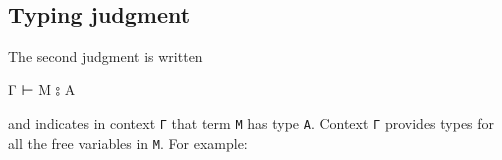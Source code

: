 \begin{fence}
\begin{code}%
\>[0]%
\>[1605I]\AgdaSymbol{:}\AgdaSpace{}%
\AgdaSpace{}%
\AgdaSymbol{\{}\AgdaSpace{}%
\AgdaSpace{}%
\AgdaSpace{}%
\AgdaSpace{}%
\AgdaSymbol{\}}\<%
\\
\>[.][@{}l@{}]\<[1605I]%
\>[3]\AgdaSpace{}%
\AgdaSymbol{\{}\AgdaSpace{}%
\AgdaSymbol{:}\AgdaSpace{}%
\AgdaSpace{}%
\AgdaSymbol{(}\AgdaSpace{}%
\AgdaSpace{}%
\AgdaSymbol{)\}}\<%
\\
%
\>[3]%
\>[1618I]\AgdaSpace{}%
\AgdaSpace{}%
\AgdaSpace{}%
\AgdaSpace{}%
\<%
\\
\>[.][@{}l@{}]\<[1618I]%
\>[5]\AgdaComment{------------------}\<%
\\
%
\>[3]\AgdaSpace{}%
\AgdaSpace{}%
\AgdaOperator{\AgdaInductiveConstructor{,}}\AgdaSpace{}%
\AgdaSpace{}%
\AgdaSpace{}%
\AgdaSpace{}%
\AgdaSpace{}%
\AgdaSpace{}%
\AgdaSpace{}%
\<%
\\
%
\\[\AgdaEmptyExtraSkip]%
\>[0]\AgdaSpace{}%
\AgdaSymbol{\{}\AgdaSpace{}%
\AgdaSymbol{=}\AgdaSpace{}%
\AgdaSymbol{\}}\AgdaSpace{}%
\AgdaSpace{}%
\AgdaSymbol{=}\AgdaSpace{}%
\AgdaSpace{}%
\AgdaSymbol{(}\AgdaSpace{}%
\AgdaSymbol{)}\AgdaSpace{}%
\<%
\end{code}
\end{fence}

\hypertarget{typing-judgment}{%
\subsection{Typing judgment}\label{typing-judgment}}

The second judgment is written

\begin{myDisplay}
Γ ⊢ M ⦂ A
\end{myDisplay}

and indicates in context \texttt{Γ} that term \texttt{M} has type
\texttt{A}. Context \texttt{Γ} provides types for all the free variables
in \texttt{M}. For example:

